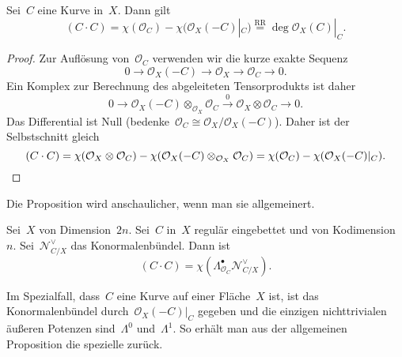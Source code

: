 \documentclass[a4paper,ngerman,12pt]{scrartcl}
\theoremstyle{definition}
\theoremstyle{plain}
\theoremstyle{remark}
\newcommand{\N}{\mathcal{N}}
\renewcommand{\O}{\mathcal{O}}
\newcommand{\lra}{\longrightarrow}
\begin{document}
\begin{prop}Sei~$C$ eine Kurve in~$X$. Dann gilt
\[ (C \cdot C) = \chi(\O_C) - \chi(\O_X(-C)|_C) \stackrel{\mathrm{RR}}{=}
  \deg \O_X(C)|_C. \]
\end{prop}
\begin{proof}
Zur Auflösung von~$\O_C$ verwenden wir die kurze exakte Sequenz
\[ 0 \lra \O_X(-C) \lra \O_X \lra \O_C \lra 0. \]
Ein Komplex zur Berechnung des abgeleiteten Tensorprodukts ist daher
\[ 0 \lra \O_X(-C) \otimes_{\O_X} \O_C \stackrel{0}{\lra} \O_X \otimes \O_C \lra 0. \]
Das Differential ist Null (bedenke~$\O_C \cong \O_X/\O_X(-C)$). Daher ist der
Selbstschnitt gleich
\[ (C \cdot C) = \chi(\O_X \otimes \O_C) - \chi(\O_X(-C) \otimes_{\O_X} \O_C)
  = \chi(\O_C) - \chi(\O_X(-C)|_C). \qedhere \]
\end{proof}

Die Proposition wird anschaulicher, wenn man sie allgemeinert.

\begin{prop}Sei~$X$ von Dimension~$2n$. Sei~$C$ in~$X$ regulär eingebettet und
von Kodimension~$n$. Sei~$\N_{C/X}^\vee$ das
Konormalenbündel. Dann ist
\[ (C \cdot C) = \chi(\Lambda^\bullet_{\O_C} \N_{C/X}^\vee). \]
\end{prop}

Im Spezialfall, dass~$C$ eine Kurve auf einer Fläche~$X$ ist, ist das
Konormalenbündel durch~$\O_X(-C)|_C$ gegeben und die einzigen nichttrivialen
äußeren Potenzen sind~$\Lambda^0$ und~$\Lambda^1$. So erhält man aus der
allgemeinen Proposition die spezielle zurück.
\end{document}
